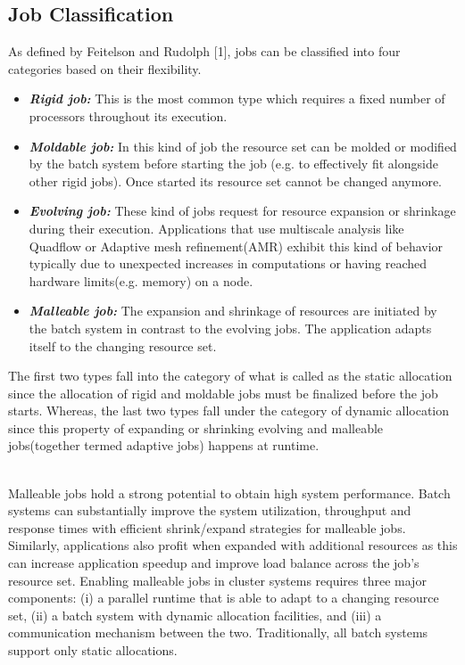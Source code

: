 \documentclass[a4paper, 12pt]{article}
\begin{document}
\subsection{Job Classification}
As defined by Feitelson and Rudolph [1], jobs can be classified into four categories based on their flexibility.
\begin{itemize}
\item \textbf{\textit{Rigid job:}} This is the most common type which requires a fixed number of processors throughout its execution.
\item \textbf{\textit{Moldable job:}} In this kind of job the resource set can be molded or modified by the batch system before starting the job (e.g. to effectively fit alongside other rigid jobs). Once started its resource set cannot be changed anymore.
\item \textbf{\textit{Evolving job:}} These kind of jobs request for resource expansion or shrinkage during their execution. Applications that use multiscale analysis like Quadflow or Adaptive mesh refinement(AMR) exhibit this kind of behavior typically due to unexpected increases in computations or having reached hardware limits(e.g. memory) on a node. 
\item \textbf{\textit{Malleable job:}} The expansion and shrinkage of resources are initiated by the batch system in contrast to the evolving jobs. The application adapts itself to the changing resource set.
\end{itemize}
The first two types fall into the category of what is called as the static allocation since the allocation of rigid and moldable jobs must be finalized before the job starts. Whereas, the last two types fall under the category of dynamic allocation since this property of expanding or shrinking evolving and malleable jobs(together termed adaptive jobs) happens at runtime.\par
\noindent
\\
Malleable jobs hold a strong potential to obtain high system performance. Batch systems can substantially improve the system utilization, throughput and response times with efficient shrink/expand strategies for malleable jobs. Similarly, applications also profit when expanded with additional resources as this can increase application speedup and improve load balance across the job’s resource set. Enabling malleable jobs in cluster systems requires three major components: (i) a parallel runtime that is able to adapt to a changing resource set, (ii) a batch system with dynamic allocation facilities, and (iii) a communication mechanism between the two. Traditionally, all batch systems support only static allocations.\par
\end{document}
